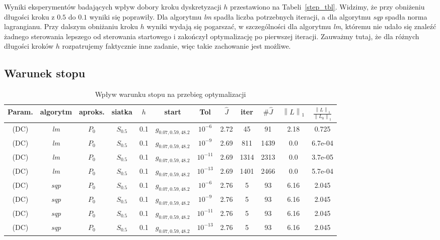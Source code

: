 \documentclass[licencjacka]{pracamgr}
\newcommand{\norm}[1]{\left\lVert#1\right\rVert}
\begin{document}
Wyniki eksperymentów badających wpływ dobory kroku dyskretyzacji $h$ przestawiono na Tabeli~\ref{step_tbl}. Widzimy, że przy obniżeniu długości kroku z $0.5$ do $0.1$ wyniki się poprawiły. Dla algorytmu {\it lm\/} spadła liczba potrzebnych iteracji, a dla algorytmu {\it sqp\/} spadła norma lagrangianu. Przy dalszym obniżaniu kroku $h$ wyniki wydają się pogarszać, w szczególności dla algorytmu {\it lm}, któremu nie udało się znaleźć żadnego sterowania lepszego od sterowania startowego i zakończył optymalizację po pierwszej iteracji. Zauważmy tutaj, że dla różnych długości kroków $h$ rozpatrujemy faktycznie inne zadanie, więc takie zachowanie jest możliwe.

\subsection{Warunek stopu}

\begin{table}[h]
  \begin{center}
    \begin{tabular}{|c|c|c|c|c|c|c||c|c|c|c|c|}
      \hline
      Param. & algorytm & aproks. & siatka & $h$ & start & Tol & $\hat{J}$ & iter & $\#\hat{J}$ & $\norm{L}_1$ & $\frac{\norm{L}_1}{\norm{L_0}_1}$ \\
      \hline
      (DC) & {\it lm\/} & $P_0$ & $S_{0.5}$ & 0.1 & $g_{0.07,0.59,48.2}$ & $10^{-6}$ & 2.72 & 45 & 91 & 2.18 & 0.725 \\
      \hline
      (DC) & {\it lm\/} & $P_0$ & $S_{0.5}$ & 0.1 & $g_{0.07,0.59,48.2}$ & $10^{-9}$ & 2.69 & 811 & 1439 & 0.0 & 6.7e-04 \\
      \hline
      (DC) & {\it lm\/} & $P_0$ & $S_{0.5}$ & 0.1 & $g_{0.07,0.59,48.2}$ & $10^{-11}$ & 2.69 & 1314 & 2313 & 0.0 & 3.7e-05 \\
      \hline
      (DC) & {\it lm\/} & $P_0$ & $S_{0.5}$ & 0.1 & $g_{0.07,0.59,48.2}$ & $10^{-13}$ & 2.69 & 1401 & 2466 & 0.0 & 5.7e-04 \\
      \hline
      (DC) & {\it sqp\/} & $P_0$ & $S_{0.5}$ & 0.1 & $g_{0.07,0.59,48.2}$ & $10^{-6}$ & 2.76 & 5 & 93 & 6.16 & 2.045 \\
      \hline
      (DC) & {\it sqp\/} & $P_0$ & $S_{0.5}$ & 0.1 & $g_{0.07,0.59,48.2}$ & $10^{-9}$ & 2.76 & 5 & 93 & 6.16 & 2.045 \\
      \hline
      (DC) & {\it sqp\/} & $P_0$ & $S_{0.5}$ & 0.1 & $g_{0.07,0.59,48.2}$ & $10^{-11}$ & 2.76 & 5 & 93 & 6.16 & 2.045 \\
      \hline
      (DC) & {\it sqp\/} & $P_0$ & $S_{0.5}$ & 0.1 & $g_{0.07,0.59,48.2}$ & $10^{-13}$ & 2.76 & 5 & 93 & 6.16 & 2.045 \\
      \hline
    \end{tabular}
    \caption{Wpływ warunku stopu na przebieg optymalizacji}\label{tol_tbl}
  \end{center}
\end{table}
\end{document}
